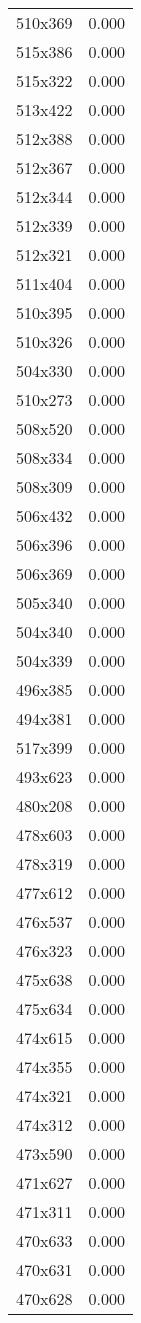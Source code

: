\begin{table}
\begin{tabular}{lr}
510x369 & 0.000 \\
515x386 & 0.000 \\
515x322 & 0.000 \\
513x422 & 0.000 \\
512x388 & 0.000 \\
512x367 & 0.000 \\
512x344 & 0.000 \\
512x339 & 0.000 \\
512x321 & 0.000 \\
511x404 & 0.000 \\
510x395 & 0.000 \\
510x326 & 0.000 \\
504x330 & 0.000 \\
510x273 & 0.000 \\
508x520 & 0.000 \\
508x334 & 0.000 \\
508x309 & 0.000 \\
506x432 & 0.000 \\
506x396 & 0.000 \\
506x369 & 0.000 \\
505x340 & 0.000 \\
504x340 & 0.000 \\
504x339 & 0.000 \\
496x385 & 0.000 \\
494x381 & 0.000 \\
517x399 & 0.000 \\
493x623 & 0.000 \\
480x208 & 0.000 \\
478x603 & 0.000 \\
478x319 & 0.000 \\
477x612 & 0.000 \\
476x537 & 0.000 \\
476x323 & 0.000 \\
475x638 & 0.000 \\
475x634 & 0.000 \\
474x615 & 0.000 \\
474x355 & 0.000 \\
474x321 & 0.000 \\
474x312 & 0.000 \\
473x590 & 0.000 \\
471x627 & 0.000 \\
471x311 & 0.000 \\
470x633 & 0.000 \\
470x631 & 0.000 \\
470x628 & 0.000 \\

\end{tabular}
\end{table}
